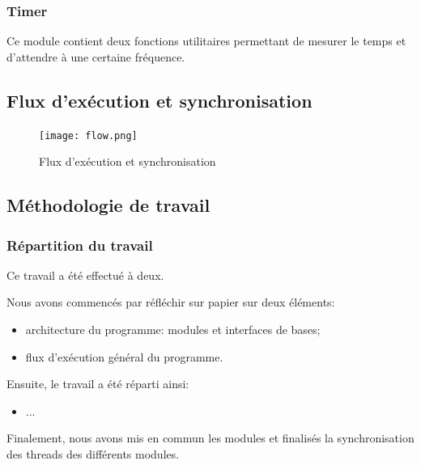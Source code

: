 \documentclass[11pt, a4paper]{article}
\begin{document}
\subsubsection{Timer}
Ce module contient deux fonctions utilitaires permettant de mesurer le temps et
d'attendre à une certaine fréquence.

\newpage

\subsection{Flux d'exécution et synchronisation}

\begin{figure}[H]
    \begin{center}
        \texttt{[image: flow.png]}
    \end{center}
    \caption{Flux d'exécution et synchronisation}
    \label{Flux d'exécution et synchronisation}
\end{figure}

\newpage

\subsection{Méthodologie de travail}
\subsubsection{Répartition du travail}

Ce travail a été effectué à deux.

Nous avons commencés par réfléchir sur papier sur deux éléments:

\begin{itemize}
    \item architecture du programme: modules et interfaces de bases;
    \item flux d'exécution général du programme. \\
\end{itemize}

Ensuite, le travail a été réparti ainsi:
\begin{itemize}
    \item ... \\
\end{itemize}

Finalement, nous avons mis en commun les modules et finalisés la synchronisation des threads des différents modules.

\newpage
\end{document}
